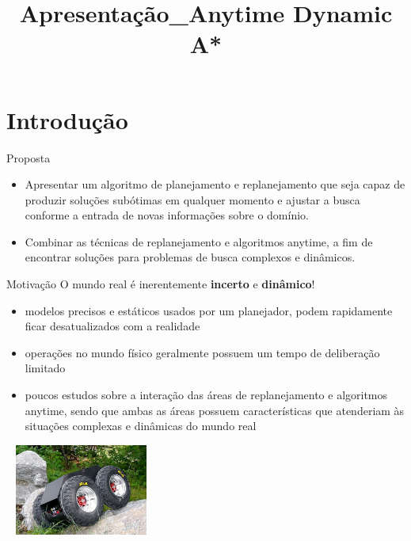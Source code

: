 \documentclass[10pt]{beamer}
\title{Apresentação_Anytime Dynamic A*}
\begin{document}
\nocite{likhachev2005anytime}
\graphicspath{ {images/} }

\maketitle

\section{Introdução}

\begin{frame}{Proposta}
\justify
\begin{itemize}
\item Apresentar um algoritmo de planejamento e replanejamento que seja capaz de produzir soluções subótimas em qualquer momento e ajustar a busca conforme a  entrada de novas informações sobre o domínio.
\vspace{1cm}
\item Combinar as técnicas de \alert{replanejamento} e \alert{algoritmos anytime}, a fim de encontrar soluções para problemas de busca complexos e dinâmicos.
\end{itemize}
\end{frame}

\begin{frame}{Motivação}
O mundo real é inerentemente \textbf{incerto} e \textbf{dinâmico}!
\begin{itemize}
\item modelos precisos e estáticos usados por um planejador, podem rapidamente ficar desatualizados com a realidade
\item operações no mundo físico geralmente possuem um tempo de deliberação limitado 
\item poucos estudos sobre a interação das áreas de replanejamento e algoritmos anytime, sendo que ambas as áreas possuem características que atenderiam às situações complexas e dinâmicas do mundo real
\end{itemize}
\hspace{5cm}
\includegraphics[width=5cm,height=3cm]{rmp.jpg} 
\end{frame}
\end{document}
